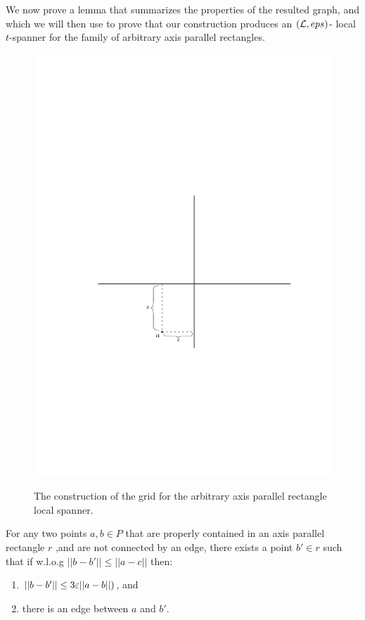 \documentclass[12pt]{article}%
\begin{document}
We now prove a lemma that summarizes the properties of the resulted graph, and which we will then use to prove that our construction produces an $(\mathcal{L}, eps)$- local $t$-spanner for the family of arbitrary axis parallel rectangles. 

\begin{figure}
	\centering
	\includegraphics[width=\linewidth, page=3]{figs/grid_construction.pdf}
	\label{fig:grid_construction}
	\caption{The construction of the grid for the arbitrary axis parallel rectangle local spanner.}
\end{figure}


\begin{claim}
	\label{clm:long_jump}
	For any two points $a,b\in P$ that are properly contained in an axis parallel rectangle $r$ ,and are not connected by an edge, there exists a point $b'\in r$ such that if w.l.o.g $||b-b'|| \leq ||a-c||$ then:
	\begin{enumerate}
		\item $||b-b'|| \leq 3\varepsilon ||a-b||)$, and
		\item there is an edge between $a$ and $b'$. 
	\end{enumerate}
	
\end{claim}
\end{document}
